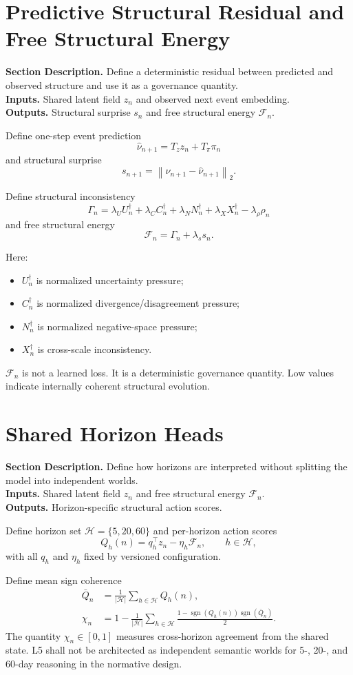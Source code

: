 \documentclass[11pt]{report}
\newcommand{\sgn}{\operatorname{sgn}}
\newcommand{\norm}[1]{\left\lVert #1 \right\rVert}
\newcommand{\meta}[3]{\textbf{Section Description.} #1\\
\textbf{Inputs.} #2\\
\textbf{Outputs.} #3\par}
\begin{document}
\section{Predictive Structural Residual and Free Structural Energy}
\meta{Define a deterministic residual between predicted and observed structure and use it as a governance quantity.}{Shared latent field $z_n$ and observed next event embedding.}{Structural surprise $s_n$ and free structural energy $\mathcal{F}_n$.}

Define one-step event prediction
\[
\hat \nu_{n+1} = T_z z_n + T_\pi \pi_n
\]
and structural surprise
\[
s_{n+1} = \norm{\nu_{n+1}-\hat \nu_{n+1}}_2.
\]

Define structural inconsistency
\[
\Gamma_n = \lambda_U U_n^{\dagger} + \lambda_C C_n^{\dagger} + \lambda_N N_n^{\dagger} + \lambda_X X_n^{\dagger} - \lambda_\rho \rho_n
\]
and free structural energy
\[
\mathcal{F}_n = \Gamma_n + \lambda_s s_n.
\]

Here:
\begin{itemize}
    \item $U_n^{\dagger}$ is normalized uncertainty pressure;
    \item $C_n^{\dagger}$ is normalized divergence/disagreement pressure;
    \item $N_n^{\dagger}$ is normalized negative-space pressure;
    \item $X_n^{\dagger}$ is cross-scale inconsistency.
\end{itemize}

$\mathcal{F}_n$ is not a learned loss. It is a deterministic governance quantity. Low values indicate internally coherent structural evolution.

\section{Shared Horizon Heads}
\meta{Define how horizons are interpreted without splitting the model into independent worlds.}{Shared latent field $z_n$ and free structural energy $\mathcal{F}_n$.}{Horizon-specific structural action scores.}

Define horizon set $\mathcal{H}=\{5,20,60\}$ and per-horizon action scores
\[
Q_h(n)=q_h^{\top}z_n - \eta_h\mathcal{F}_n,\qquad h\in\mathcal{H},
\]
with all $q_h$ and $\eta_h$ fixed by versioned configuration.

Define mean sign coherence
\begin{align*}
\bar Q_n &= \frac{1}{|\mathcal{H}|}\sum_{h\in\mathcal{H}}Q_h(n),\\
\chi_n &= 1-\frac{1}{|\mathcal{H}|}\sum_{h\in\mathcal{H}}\frac{1-\sgn(Q_h(n))\sgn(\bar Q_n)}{2}.
\end{align*}
The quantity $\chi_n\in[0,1]$ measures cross-horizon agreement from the shared state. L5 shall not be architected as independent semantic worlds for 5-, 20-, and 60-day reasoning in the normative design.
\end{document}
